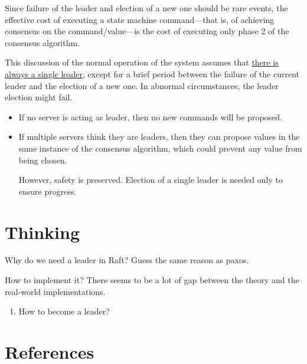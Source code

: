 \documentclass[11pt]{article}
\begin{document}
Since failure of the leader and election of a new one should be rare events, the effective cost of
executing a state machine command—that is, of achieving consensus on the command/value—is the cost of
executing only phase 2 of the consensus algorithm.

This discussion of the normal operation of the system assumes that
\uline{there is always a single leader}, except for a brief period between the failure of the current leader
and the election of a new one. In abnormal circumstances, the leader election might fail.
\begin{itemize}
\item If no server is acting as leader, then no new commands will be proposed.
\item If multiple servers think they are leaders, then they can propose values in the same instance of
the consensus algorithm, which could prevent any value from being chosen.

However, safety is preserved. Election of a single leader is needed only to ensure progress.
\end{itemize}
\section{Thinking}
\label{sec:orgac802a4}
Why do we need a leader in Raft? Guess the same reason as paxos.

How to implement it? There seems to be a lot of gap between the theory and the real-world
implementations.
\begin{enumerate}
\item How to become a leader?
\end{enumerate}
\section{References}
\label{sec:org9e9b29a}
\label{bibliographystyle link}


\label{bibliography link}

\end{document}
